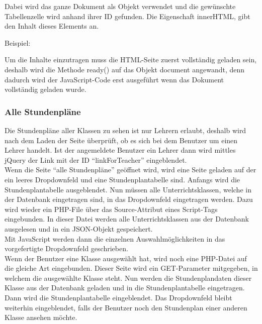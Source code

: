 Dabei wird das ganze Dokument als Objekt verwendet und die gewünschte Tabellenzelle wird anhand ihrer ID gefunden. Die Eigenschaft innerHTML, gibt den Inhalt dieses Elements an.

Beispiel:

	


Um die Inhalte einzutragen muss die HTML-Seite zuerst vollständig geladen sein, deshalb wird die Methode ready() auf das Objekt document angewandt, denn dadurch wird der JavaScript-Code erst ausgeführt wenn das Dokument vollständig geladen wurde.

\subsubsection{Alle Stundenpläne}

Die Stundenpläne aller Klassen zu sehen ist nur Lehrern erlaubt, deshalb wird nach  dem Laden der Seite überprüft, ob es sich bei dem Benutzer um einen Lehrer handelt. Ist der angemeldete Benutzer ein Lehrer dann wird mittles jQuery der Link mit der ID \enquote{linkForTeacher} eingeblendet.\\



Wenn die Seite \enquote{alle Stundenpläne} geöffnet wird, wird eine Seite geladen auf der ein leeres Dropdownfeld und eine Stundenplantabelle sind. Anfangs wird die Stundenplantabelle ausgeblendet. Nun müssen alle Unterrichtsklassen, welche in der Datenbank eingetragen sind, in das Dropdownfeld eingetragen werden. Dazu wird wieder ein PHP-File über das Source-Attribut eines Script-Tags eingebunden. In dieser Datei werden alle Unterrichtsklassen aus der Datenbank ausgelesen und in ein JSON-Objekt gespeichert.\\
Mit JavaScript werden dann die einzelnen Auswahlmöglichkeiten in das vorgefertigte Dropdownfeld geschrieben.\\

Wenn der Benutzer eine Klasse ausgewählt hat, wird noch eine PHP-Datei auf die gleiche Art eingebunden. Dieser Seite wird ein GET-Parameter mitgegeben, in welchem die ausgewählte Klasse steht. Nun werden die Stundenplandaten dieser Klasse aus der Datenbank geladen und in die Stundenplantabelle eingetragen. Dann wird die Stundenplantabelle eingeblendet. Das Dropdownfeld bleibt weiterhin eingeblendet, falls der Benutzer noch den Stundenplan einer anderen Klasse ansehen möchte.\\

